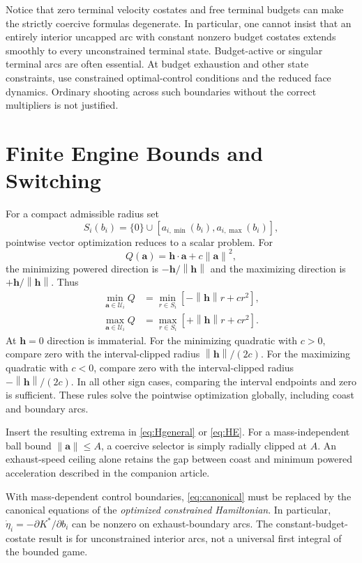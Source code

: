 \documentclass[journal,a4paper]{IEEEtran}
\newcommand{\U}{\mathcal U}
\newcommand{\norm}[1]{\left\|#1\right\|}
\begin{document}
Notice that zero terminal velocity costates and free terminal budgets can make the strictly coercive formulas degenerate. In particular, one cannot insist that an entirely interior uncapped arc with constant nonzero budget costates extends smoothly to every unconstrained terminal state. Budget-active or singular terminal arcs are often essential. At budget exhaustion and other state constraints, use constrained optimal-control conditions and the reduced face dynamics. Ordinary shooting across such boundaries without the correct multipliers is not justified.

\section{Finite Engine Bounds and Switching}
\label{sec:bounded}
For a compact admissible radius set
\begin{equation}
 S_i(b_i)=\{0\}\cup[a_{i,\min}(b_i),a_{i,\max}(b_i)],
\end{equation}
pointwise vector optimization reduces to a scalar problem. For
\begin{equation}
 Q(\mathbf a)=\mathbf h\cdot\mathbf a+c\norm{\mathbf a}^2,
\end{equation}
the minimizing powered direction is $-\mathbf h/\norm{\mathbf h}$ and the maximizing direction is $+\mathbf h/\norm{\mathbf h}$. Thus
\begin{align}
 \min_{\mathbf a\in\U_i}Q
     &=\min_{r\in S_i}[-\norm{\mathbf h}r+cr^2],\label{eq:minradius}\\
 \max_{\mathbf a\in\U_i}Q
     &=\max_{r\in S_i}[+\norm{\mathbf h}r+cr^2].\label{eq:maxradius}
\end{align}
At $\mathbf h=0$ direction is immaterial. For the minimizing quadratic with $c>0$, compare zero with the interval-clipped radius $\norm{\mathbf h}/(2c)$. For the maximizing quadratic with $c<0$, compare zero with the interval-clipped radius $-\norm{\mathbf h}/(2c)$. In all other sign cases, comparing the interval endpoints and zero is sufficient. These rules solve the pointwise optimization globally, including coast and boundary arcs.

Insert the resulting extrema in \eqref{eq:Hgeneral} or \eqref{eq:HE}. For a mass-independent ball bound $\norm{\mathbf a}\le A$, a coercive selector is simply radially clipped at $A$. An exhaust-speed ceiling alone retains the gap between coast and minimum powered acceleration described in the companion article.

With mass-dependent control boundaries, \eqref{eq:canonical} must be replaced by the canonical equations of the \emph{optimized constrained Hamiltonian}. In particular, $\dot\eta_i=-\partial K^*/\partial b_i$ can be nonzero on exhaust-boundary arcs. The constant-budget-costate result is for unconstrained interior arcs, not a universal first integral of the bounded game.
\end{document}
